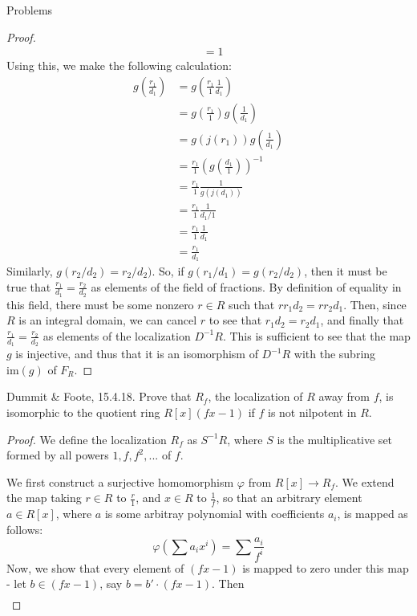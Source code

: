 \documentclass[12pt]{article}
\theoremstyle{definition}
\newenvironment{problem}[2][Problem]{\begin{trivlist}
\item[\hskip \labelsep {\bfseries #1}\hskip \labelsep {\bfseries #2.}]}{\end{trivlist}}
\begin{document}
\begin{section}{Problems}
\begin{proof}
\begin{align*}
    &= 1
\end{align*}
Using this, we make the following calculation:
\begin{align*}
    g \left (\frac{r_1}{d_1} \right) &= g \left ( \frac{r_1}{1} \frac{1}{d_1} \right )\\
    &= g\left (\frac{r_1}{1} \right ) g \left (\frac{1}{d_1} \right) \\
    &= g(j(r_1)) g \left ( \frac{1}{d_1} \right)\\
    &= \frac{r_1}{1} \left(g \left ( \frac{d_1}{1} \right )\right)^{-1}\\
    &= \frac{r_1}{1} \frac{1}{g ( j(d_1))}\\
    &=\frac{r_1}{1} \frac{1}{d_1/1}\\
    &= \frac{r_1}{1} \frac{1}{d_1}\\
    &= \frac{r_1}{d_1}
\end{align*}
Similarly, $g(r_2/d_2) = r_2/d_2)$. So, if $g(r_1/d_1) = g(r_2/d_2)$, then it must be true that $\frac{r_1}{d_1} = \frac{r_2}{d_2}$ as elements of the field of fractions. By definition of equality in this field, there must be some nonzero $r \in R$ such that $rr_1d_2 = rr_2d_1$. Then, since $R$ is an integral domain, we can cancel $r$ to see that $r_1d_2 = r_2d_1$, and finally that $\frac{r_1}{d_1} = \frac{r_2}{d_2}$ as elements of the localization $D^{-1}R$. This is sufficient to see that the map $g$ is injective, and thus that it is an isomorphism of $D^{-1}R$ with the subring $\text{im}(g)$ of $F_R$.
\end{proof}
\begin{problem}{2}
Dummit \& Foote, 15.4.18. Prove that $R_f$, the localization of $R$ away from $f$, is isomorphic to the quotient ring $R[x](fx - 1)$ if $f$ is not nilpotent in $R$. 
\end{problem}
\begin{proof}
We define the localization $R_f$ as $S^{-1}R$, where $S$ is the multiplicative set formed by all powers $1, f, f^2, ... $ of $f$. 
\par We first construct a surjective homomorphism $\varphi$ from $R[x] \to R_f$. We extend the map taking $r \in R$ to $\frac{r}{1}$, and $x \in R$ to $\frac{1}{f}$, so that an arbitrary element $a \in R[x]$, where $a$ is some arbitray polynomial with coefficients $a_i$, is mapped as follows:
\[\varphi \left( \sum a_i x^i \right) = \sum \frac{a_i}{f^i}\]
Now, we show that every element of $(fx -1)$ is mapped to zero under this map - let $b \in (fx - 1)$, say $b = b' \cdot (fx - 1)$. Then 
\begin{align*}

\end{align*}
\end{proof}
\end{section}
\end{document}
